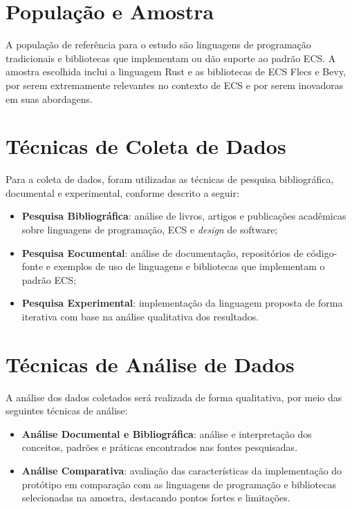 \section{População e Amostra}

A população de referência para o estudo são linguagens de programação tradicionais e bibliotecas que implementam ou dão suporte ao padrão ECS. A amostra escolhida inclui a linguagem Rust e as bibliotecas de ECS Flecs e Bevy, por serem extremamente relevantes no contexto de ECS e por serem inovadoras em suas abordagens.

\section{Técnicas de Coleta de Dados}

Para a coleta de dados, foram utilizadas as técnicas de pesquisa bibliográfica, documental e experimental, conforme descrito a seguir:

\begin{itemize}
    \item \textbf{Pesquisa Bibliográfica}: análise de livros, artigos e publicações acadêmicas sobre linguagens de programação, ECS e \textit{design} de software;
    \item \textbf{Pesquisa Eocumental}: análise de documentação, repositórios de código-fonte e exemplos de uso de linguagens e bibliotecas que implementam o padrão ECS;
    \item \textbf{Pesquisa Experimental}: implementação da linguagem proposta de forma iterativa com base na análise qualitativa dos resultados.
\end{itemize}

\section{Técnicas de Análise de Dados}

A análise dos dados coletados será realizada de forma qualitativa, por meio das seguintes técnicas de análise:

\begin{itemize}
    \item \textbf{Análise Documental e Bibliográfica}: análise e interpretação dos conceitos, padrões e práticas encontrados nas fontes pesquisadas.
    \item \textbf{Análise Comparativa}: avaliação das características da implementação do protótipo em comparação com as linguagens de programação e bibliotecas selecionadas na amostra, destacando pontos fortes e limitações.
\end{itemize}

